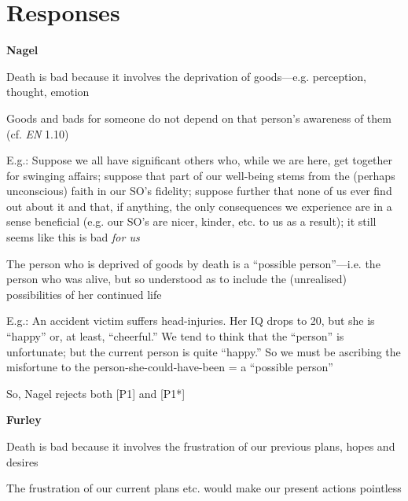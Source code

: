 \documentclass[11pt]{article}
\begin{document}
\section*{Responses}

\noindent \textbf{Nagel}
\vspace*{2mm}

\noindent [1] Death is bad because it involves the deprivation of goods---e.g. perception, thought, emotion
\vspace*{1mm}

\noindent [2] Goods and bads for someone do not depend on that person's awareness of them (cf. \emph{EN} 1.10)
\vspace*{1mm}

\noindent E.g.: Suppose we all have significant others who, while we are here, get together for swinging affairs; suppose that part of our well-being stems from the (perhaps unconscious) faith in our SO's fidelity; suppose further that none of us ever find out about it and that, if anything, the only consequences we experience are in a sense beneficial (e.g. our SO's are nicer, kinder, etc. to us as a result); it still seems like this is bad \emph{for us}
\vspace*{2mm}

\noindent [3] The person who is deprived of goods by death is a ``possible person''---i.e. the person who was alive, but so understood as to include the (unrealised) possibilities of her continued life
\vspace*{1mm}

\noindent E.g.: An accident victim suffers head-injuries. Her IQ drops to 20, but she is ``happy'' or, at least, ``cheerful.'' We tend to think that the ``person'' is unfortunate; but the current person is quite ``happy.'' So we must be ascribing the misfortune to the person-she-could-have-been = a ``possible person''
\vspace*{2mm}

\noindent So, Nagel rejects both [P1] and [P1*]
\vspace*{5mm}

\noindent \textbf{Furley}
\vspace*{2mm}

\noindent [1] Death is bad because it involves the frustration of our previous plans, hopes and desires
\vspace*{1mm}

\noindent [2] The frustration of our current plans etc. would make our present actions pointless
\vspace*{1mm}
\end{document}
